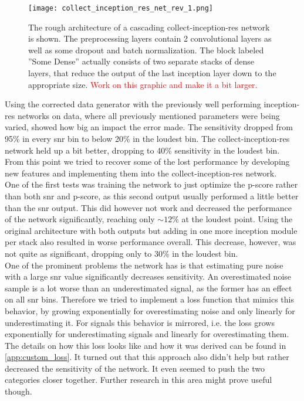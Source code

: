 \begin{figure}
\centering
\texttt{[image: collect\_inception\_res\_net\_rev\_1.png]}
\caption[Cascading architecture of a collect-inception-res network]{The rough architecture of a cascading collect-inception-res network is shown. The preprocessing layers contain 2 convolutional layers as well as some dropout and batch normalization. The block labeled ''Some Dense'' actually consists of two separate stacks of dense layers, that reduce the output of the last inception layer down to the appropriate size. \textcolor{red}{Work on this graphic and make it a bit larger.}}\label{fig:cascade_inception_res_net}
\end{figure}

\noindent Using the corrected data generator with the previously well performing inception-res networks on data, where all previously mentioned parameters were being varied, showed how big an impact the error made. The sensitivity dropped from 95\% in every \gls{snr} bin to below 20\% in the loudest bin. The collect-inception-res network held up a bit better, dropping to 40\% sensitivity in the loudest bin. From this point we tried to recover some of the lost performance by developing new features and implementing them into the collect-inception-res network.\medskip\\
One of the first tests was training the network to just optimize the p-score rather than both \gls{snr} and p-score, as this second output usually performed a little better than the \gls{snr} output. This did however not work and decreased the performance of the network significantly, reaching only $\sim 12\%$ at the loudest point. Using the original architecture with both outputs but adding in one more inception module per stack also resulted in worse performance overall. This decrease, however, was not quite as significant, dropping only to 30\% in the loudest bin.\smallskip\\
One of the prominent problems the network has is that estimating pure noise with a large \gls{snr} value significantly decreases sensitivity. An overestimated noise sample is a lot worse than an underestimated signal, as the former has an effect on all \gls{snr} bins. Therefore we tried to implement a loss function that mimics this behavior, by growing exponentially for overestimating noise and only linearly for underestimating it. For signals this behavior is mirrored, i.e. the loss grows exponentially for underestimating signals and linearly for overestimating them. The details on how this loss looks like and how it was derived can be found in \autoref{app:custom_loss}. It turned out that this approach also didn't help but rather decreased the sensitivity of the network. It even seemed to push the two categories closer together. Further research in this area might prove useful though.\medskip\\
